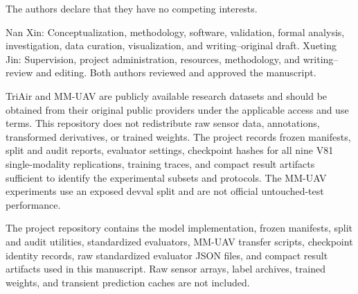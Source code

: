 The authors declare that they have no competing interests.

Nan Xin: Conceptualization, methodology, software, validation, formal analysis, investigation, data curation, visualization, and writing--original draft. Xueting Jin: Supervision, project administration, resources, methodology, and writing--review and editing. Both authors reviewed and approved the manuscript.

TriAir and MM-UAV are publicly available research datasets and should be obtained from their original public providers under the applicable access and use terms. This repository does not redistribute raw sensor data, annotations, transformed derivatives, or trained weights. The project records frozen manifests, split and audit reports, evaluator settings, checkpoint hashes for all nine V81 single-modality replications, training traces, and compact result artifacts sufficient to identify the experimental subsets and protocols. The MM-UAV experiments use an exposed devval split and are not official untouched-test performance.

The project repository contains the model implementation, frozen manifests, split and audit utilities, standardized evaluators, MM-UAV transfer scripts, checkpoint identity records, raw standardized evaluator JSON files, and compact result artifacts used in this manuscript. Raw sensor arrays, label archives, trained weights, and transient prediction caches are not included.

